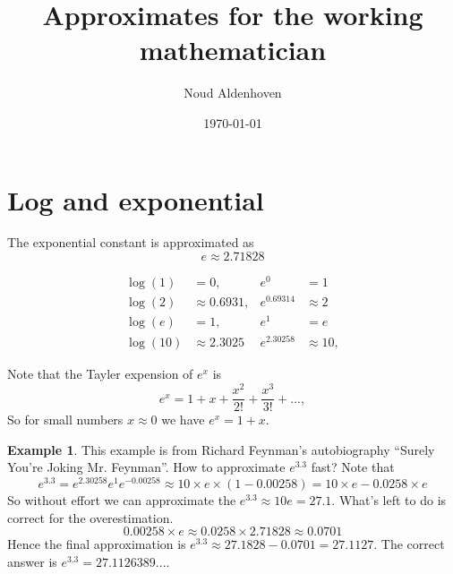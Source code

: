 \documentclass[10pt]{article}
\theoremstyle{definition}
\newtheorem{example}{Example}[section]
\begin{document}
\title{Approximates for the working mathematician}
\author{Noud Aldenhoven}
\date{\today}
\maketitle

\section{Log and exponential}

The exponential constant is approximated as
\begin{equation*}
    e \approx 2.71828
\end{equation*}

\begin{align*}
    \log(1) &= 0,               & e^0 &= 1 \\
    \log(2) &\approx 0.6931,    & e^{0.69314} &\approx 2 \\
    \log(e) &= 1,               & e^{1} &= e \\
    \log(10) &\approx 2.3025    & e^{2.30258} &\approx 10,
\end{align*}

Note that the Tayler expension of $e^x$ is
\begin{equation*}
    e^x = 1 + x + \frac{x^2}{2!} + \frac{x^3}{3!} + ...,
\end{equation*}
So for small numbers $x \approx 0$ we have $e^x = 1 + x$.

\begin{example}
    This example is from Richard Feynman's autobiography ``Surely You're Joking Mr. Feynman''.
    How to approximate $e^{3.3}$ fast?
    Note that
    \begin{equation*}
        e^{3.3} = e^{2.30258} e^{1} e^{-0.00258}
            \approx 10 \times e \times (1 - 0.00258)
            = 10 \times e - 0.0258 \times e
    \end{equation*}
    So without effort we can approximate the $e^{3.3} \approx 10 e = 27.1$.
    What's left to do is correct for the overestimation.
    \begin{equation*}
        0.00258 \times e
            \approx 0.0258 \times 2.71828
            \approx 0.0701
    \end{equation*}
    Hence the final approximation is $e^{3.3} \approx 27.1828 - 0.0701 = 27.1127$.
    The correct answer is $e^{3.3} = 27.1126389...$.
\end{example}
\end{document}
